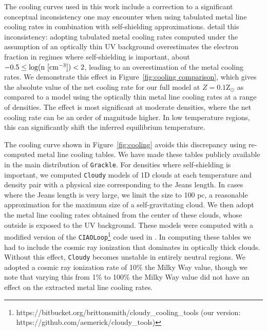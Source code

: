 \documentclass[twocolumn]{aastex61}
\begin{document}
The cooling curves used in this work include a correction to a significant conceptual inconsistency one may encounter when using tabulated metal line cooling rates in combination with self-shielding approximations. \citet{Hu2017} detail this inconsistency: adopting tabulated metal cooling rates computed under the assumption of an optically thin UV background overestimates the electron fraction in regimes where self-shielding is important, about $-0.5 \leq \rm{log(n~[cm^{-3}])} < 2$, leading to an overestimation of the metal cooling rates. We demonstrate this effect in Figure~\ref{fig:cooling comparison}, which gives the absolute value of the net cooling rate
for our full model at $Z = 0.1$Z$_{\odot}$ as compared to a model using the optically thin metal line cooling rates at a range of densities. The effect is most significant at moderate densities, where the net cooling rate can be an order of magnitude higher. In low temperature regions, this can significantly shift the inferred equilibrium temperature.

The cooling curve shown in Figure~\ref{fig:cooling} avoids this discrepancy using re-computed metal line cooling tables. We have made these tables publicly available in the main distribution of \texttt{Grackle}. For densities where self-shielding is important, we computed \texttt{Cloudy} models of 1D clouds at each temperature and density pair with a physical size corresponding to the Jeans length. In cases where the Jeans length is very large, we limit the size to 100 pc, a reasonable approximation for the maximum size of a self-gravitating cloud. We then adopt the metal line cooling rates obtained from the center of these clouds, whose outside is exposed to the UV background. These models were computed with a modified version of the \texttt{CIAOLoop}\footnote{https://bitbucket.org/brittonsmith/cloudy\_cooling\_tools (our version: https://github.com/aemerick/cloudy\_tools)} code used in \citet{2008MNRAS.385.1443S}. In computing these tables we had to include the cosmic ray ionization that dominates in optically thick clouds. Without this effect, \texttt{Cloudy} becomes unstable in entirely neutral regions. We adopted a cosmic ray ionization rate of 10\% the Milky Way value, though we note that varying this from 1\% to 100\% the Milky Way value did not have an effect on the extracted metal line cooling rates. 
\end{document}
